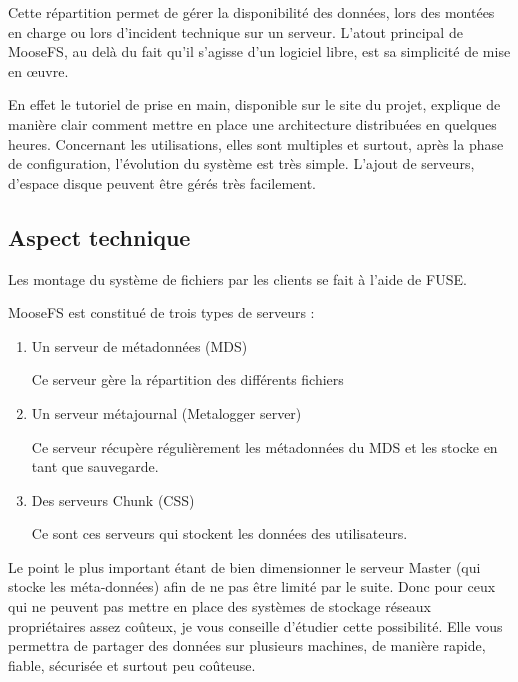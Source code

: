 \documentclass[12pt]{report}
\begin{document}
			Cette répartition permet de gérer la disponibilité des données,
			lors des montées en charge ou lors d’incident technique sur un serveur.
			L'atout principal de MooseFS, au delà du fait qu'il s’agisse d’un logiciel libre, est sa simplicité de mise en œuvre.
			
			En effet le tutoriel de prise en main, disponible sur le site du projet,
			explique de manière clair comment mettre en place une architecture distribuées en quelques heures.
			Concernant les utilisations, elles sont multiples et surtout, après la phase de configuration,
			l'évolution du système est très simple. L'ajout de serveurs, d’espace disque peuvent être gérés très facilement.

		\subsection{Aspect technique}
			
			Les montage du système de fichiers par les clients se fait à l'aide de FUSE. %

			MooseFS est constitué de trois types de serveurs :

			\begin{enumerate}
				\item Un serveur de métadonnées (MDS)

				Ce serveur gère la répartition des différents fichiers
				\item Un serveur métajournal (Metalogger server)

				Ce serveur récupère régulièrement les métadonnées du MDS et les stocke en tant que sauvegarde.
				\item Des serveurs Chunk (CSS) %

				Ce sont ces serveurs qui stockent les données des utilisateurs.
			\end{enumerate}
			
			Le point le plus important étant de bien dimensionner le serveur Master (qui stocke les méta-données)
			afin de ne pas être limité par le suite.
			Donc pour ceux qui ne peuvent pas mettre en place des systèmes de stockage réseaux propriétaires assez coûteux,
			je vous conseille d’étudier cette possibilité. Elle vous permettra de partager des données sur plusieurs machines,
			de manière rapide, fiable, sécurisée et surtout peu coûteuse.
\end{document}
